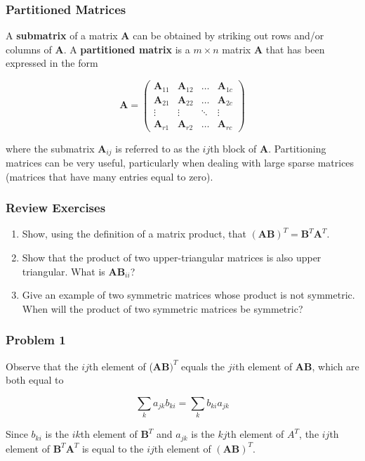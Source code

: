 \documentclass{beamer}
\begin{document}
\begin{frame}
\frametitle{Partitioned Matrices}
A \textbf{submatrix} of a matrix $\mathbf{A}$ can be obtained by striking out rows and/or columns of $\mathbf{A}$.  A \textbf{partitioned matrix} is a $m \times n$ matrix $\mathbf{A}$ that has been expressed in the form 

\[\mathbf{A} = 
\begin{pmatrix}
    \mathbf{A}_{11} & \mathbf{A}_{12} & \dots  & \mathbf{A}_{1c} \\
    \mathbf{A}_{21} & \mathbf{A}_{22}  & \dots  & \mathbf{A}_{2c} \\
    \vdots & \vdots  & \ddots & \vdots \\
    \mathbf{A}_{r1} & \mathbf{A}_{r2}  & \dots  & \mathbf{A}_{rc}
\end{pmatrix}
\]

where the submatrix $\mathbf{A}_{ij}$ is referred to as the $ij$th block of $\mathbf{A}$.  Partitioning matrices can be very useful, particularly when dealing with large sparse matrices (matrices that have many entries equal to zero).
\end{frame}

\begin{frame}
\frametitle{Review Exercises}
\begin{enumerate}
\item Show, using the definition of a matrix product, that $(\mathbf{AB})^T = \mathbf{B}^T\mathbf{A}^T$.

\item Show that the product of two upper-triangular matrices is also upper triangular.  What is $\mathbf{AB}_{ii}$?

\item Give an example of two symmetric matrices whose product is not symmetric.  When will the product of two symmetric matrices be symmetric? 

\end{enumerate}
\end{frame}

\begin{frame}
\frametitle{Problem 1}
Observe that the $ij$th element of ($\mathbf{AB})^T$ equals the $ji$th element of $\mathbf{AB}$, which are both equal to 

$$ \sum_k a_{jk}b_{ki} = \sum_k b_{ki} a_{jk}$$

Since $b_{ki}$ is the $ik$th element of $\mathbf{B}^T$ and $a_{jk}$ is the $kj$th element of $A^T$, the $ij$th element of $\mathbf{B}^T\mathbf{A}^T$ is equal to the $ij$th element of $\mathbf{(AB)}^T$.
\end{frame}
\end{document}
